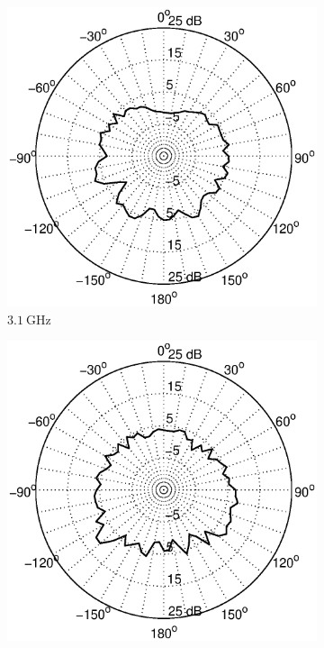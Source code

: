 \documentclass[a4paper]{article}        %
\begin{document}
		\begin{figure}[H]
		\begin{subfigure}{0.5\textwidth}
			\includegraphics[width=\textwidth]{images/antenna/radpat_azi_3G}
			\caption{$\SI{3.1}{\giga\hertz}$}
		\end{subfigure}
		\begin{subfigure}{0.5\textwidth}
			\includegraphics[width=\textwidth]{images/antenna/radpat_azi_4_3G}

\end{subfigure}
\end{figure}
\end{document}
